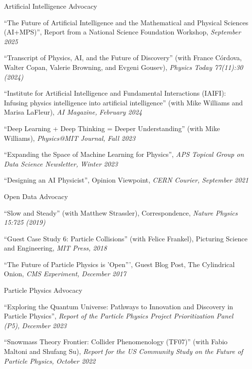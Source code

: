 \item Artificial Intelligence Advocacy 
\bsbl 
\item ``The Future of Artificial Intelligence and the Mathematical and Physical Sciences (AI+MPS)'', Report from a National Science Foundation Workshop, \emph{September 2025}
\item ``Transcript of Physics, AI, and the Future of Discovery'' (with France Córdova, Walter Copan, Valerie Browning, and Evgeni Gousev), \emph{Physics Today 77(11):30 (2024)}
\item ``Institute for Artificial Intelligence and Fundamental Interactions (IAIFI): Infusing physics intelligence into artificial intelligence'' (with Mike Williams and Marisa LaFleur), \emph{AI Magazine,} \emph{February 2024}
\item ``Deep Learning + Deep Thinking = Deeper Understanding'' (with Mike Williams), \emph{Physics@MIT Journal,} \emph{Fall 2023}
\item ``Expanding the Space of Machine Learning for Physics'', \emph{APS Topical Group on Data Science Newsletter,} \emph{Winter 2023}
\item ``Designing an AI Physicist'', Opinion Viewpoint, \emph{CERN Courier,} \emph{September 2021}
\el 
\item Open Data Advocacy 
\bsbl 
\item ``Slow and Steady'' (with Matthew Strassler), Correspondence, \emph{Nature Physics 15:725 (2019)}
\item ``Guest Case Study 6:  Particle Collisions'' (with Felice Frankel), Picturing Science and Engineering, \emph{MIT Press,} \emph{2018}
\item ``The Future of Particle Physics is 'Open''', Guest Blog Post, The Cylindrical Onion, \emph{CMS Experiment,} \emph{December 2017}
\el 
\item Particle Physics Advocacy 
\bsbl 
\item ``Exploring the Quantum Universe: Pathways to Innovation and Discovery in Particle Physics'', \emph{Report of the Particle Physics Project Prioritization Panel (P5),} \emph{December 2023}
\item ``Snowmass Theory Frontier:  Collider Phenomenology (TF07)'' (with Fabio Maltoni and Shufang Su), \emph{Report for the US Community Study on the Future of Particle Physics,} \emph{October 2022}
\el 
